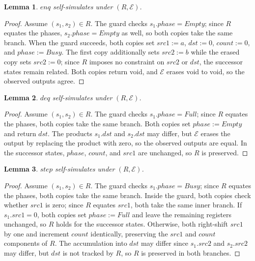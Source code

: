 \documentclass[fontset=fira-newtxsf]{mitthesis}
\theoremstyle{definition}
\theoremstyle{plain}
\newtheorem{lemma}{Lemma}[section]
\begin{document}
\begin{lemma} \label{lem:mult-enq}
$\mathit{enq}$ self-simulates under $(R, \mathcal{E})$.
\end{lemma}

\begin{proof}[Proof]
Assume $(s_1, s_2) \in R$.
The guard checks $s_1.\mathit{phase} = \mathit{Empty}$; since $R$ equates the phases, $s_2.\mathit{phase} = \mathit{Empty}$ as well, so both copies take the same branch.
When the guard succeeds, both copies set $\mathit{src1} := a$, $\mathit{dst} := 0$, $\mathit{count} := 0$, and $\mathit{phase} := \mathit{Busy}$.
The first copy additionally sets $\mathit{src2} := b$ while the erased copy sets $\mathit{src2} := 0$; since $R$ imposes no constraint on $\mathit{src2}$ or $\mathit{dst}$, the successor states remain related.
Both copies return void, and $\mathcal{E}$ erases void to void, so the observed outputs agree.
\end{proof}

\begin{lemma} \label{lem:mult-deq}
$\mathit{deq}$ self-simulates under $(R, \mathcal{E})$.
\end{lemma}

\begin{proof}[Proof]
Assume $(s_1, s_2) \in R$.
The guard checks $s_1.\mathit{phase} = \mathit{Full}$; since $R$ equates the phases, both copies take the same branch.
Both copies set $\mathit{phase} := \mathit{Empty}$ and return $\mathit{dst}$.
The products $s_1.\mathit{dst}$ and $s_2.\mathit{dst}$ may differ, but $\mathcal{E}$ erases the output by replacing the product with zero, so the observed outputs are equal.
In the successor states, $\mathit{phase}$, $\mathit{count}$, and $\mathit{src1}$ are unchanged, so $R$ is preserved.
\end{proof}

\begin{lemma} \label{lem:mult-rule}
$\mathit{step}$ self-simulates under $(R, \mathcal E)$.
\end{lemma}

\begin{proof}[Proof]
Assume $(s_1, s_2) \in R$.
The guard checks $s_1.\mathit{phase} = \mathit{Busy}$; since $R$ equates the phases, both copies take the same branch.
Inside the guard, both copies check whether $\mathit{src1}$ is zero; since $R$ equates $\mathit{src1}$, both take the same inner branch.
If $s_1.\mathit{src1} = 0$, both copies set $\mathit{phase} := \mathit{Full}$ and leave the remaining registers unchanged, so $R$ holds for the successor states.
Otherwise, both right-shift $\mathit{src1}$ by one and increment $\mathit{count}$ identically, preserving the $\mathit{src1}$ and $\mathit{count}$ components of $R$.
The accumulation into $\mathit{dst}$ may differ since $s_1.\mathit{src2}$ and $s_2.\mathit{src2}$ may differ, but $\mathit{dst}$ is not tracked by $R$, so $R$ is preserved in both branches.
\end{proof}
\end{document}
